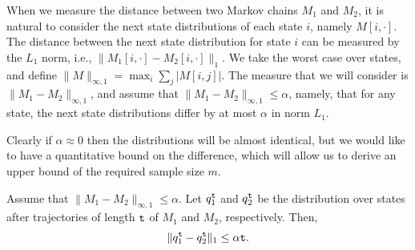 When we measure the distance between two Markov chains $M_1$ and
$M_2$, it is natural to consider the next state distributions of
each state $i$, namely $M[i,\cdot]$. The distance between the next state distribution for state $i$
can be measured by the $L_1$ norm, i.e., $\|
M_1[i,\cdot]-M_2[i,\cdot]\|_1 $. We take the worst
case over states, and define $\|M\|_{\infty,1} = \max_i \sum_j
|M[i,j]|$. The measure that we will consider is
$\|M_1-M_2\|_{\infty,1}$, and assume that
$\|M_1-M_2\|_{\infty,1}\leq \alpha$, namely, that for any state, the
next state distributions differ by at most $\alpha$ in norm $L_1$.



Clearly if $\alpha\approx 0$ then the distributions will be almost
identical, but we would like to have a quantitative bound on the
difference, which will allow us to derive an upper bound of the
required sample size $m$.



\begin{theorem}
\label{thm:l1-error}
%
Assume that $\|M_1-M_2\|_{\infty,1}\leq \alpha$.
%
Let $q_1^{\tt t}$ and $q_2^{\tt t}$ be the distribution over states
after trajectories  of length ${\tt t}$ of $M_1$ and $M_2$,
respectively. Then,
\[
\|q_1^{\tt t}-q_2^{\tt t}\|_1\leq \alpha  {\tt t}.
\]
\end{theorem}


